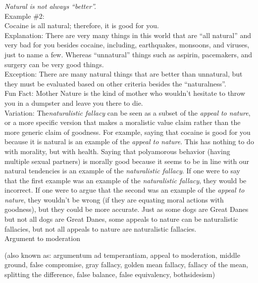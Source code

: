 \documentclass[a4paper,12pt,single,pdftex]{scrbook}
\begin{document}
      
        {\it Natural is not always “better”.}
      \\

      
        Example \#2:
      \\

      
        Cocaine is all natural; therefore, it is good for you.
      \\

      
        Explanation: There are very many things in this world that are “all natural” and very bad for you besides cocaine, including, earthquakes, monsoons, and viruses, just to name a few.  Whereas “unnatural” things such as aspirin, pacemakers, and surgery can be very good things.
      \\

      
        Exception: There are many natural things that are better than unnatural, but they must be evaluated based on other criteria besides the “naturalness”.
      \\

      
        Fun Fact: Mother Nature is the kind of mother who wouldn’t hesitate to throw you in a dumpster and leave you there to die.
      \\

      
        Variation: The{\it  naturalistic fallacy} can be seen as a subset of the {\it appeal to nature}, or a more specific version that makes a moralistic value claim rather than the more generic claim of goodness. For example, saying that cocaine is good for you because it is natural is an example of the {\it appeal to nature}. This has nothing to do with morality, but with health. Saying that polyamorous behavior (having multiple sexual partners) is morally good because it seems to be in line with our natural tendencies is an example of the {\it naturalistic fallacy}. If one were to say that the first example was an example of the {\it naturalistic fallacy}, they would be incorrect. If one were to argue that the second was an example of the {\it appeal to nature}, they wouldn't be wrong (if they are equating moral actions with goodness), but they could be more accurate. Just as some dogs are Great Danes but not all dogs are Great Danes, some appeals to nature can be naturalistic fallacies, but not all appeals to nature are naturalistic fallacies.
      \\

    
  

Argument to moderation
    
      (also known as: argumentum ad temperantiam, appeal to moderation, middle ground, false compromise, gray fallacy, golden mean fallacy, fallacy of the mean, splitting the difference, false balance, false equivalency, bothsidesism)
    \\
\end{document}
